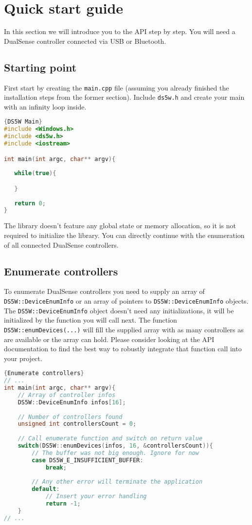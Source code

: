 \section{Quick start guide}
In this section we will introduce you to the API step by step. You will need a DualSense controller connected via USB or Bluetooth.

\subsection{Starting point}
First start by creating the \texttt{main.cpp} file (assuming you already finished the installation steps from the former section). Include \texttt{ds5w.h} and create your main with an infinity loop inside.
\begin{lstlisting}[language=C++,label=code0,caption={DS5W Main}]{DS5W Main}
#include <Windows.h>
#include <ds5w.h>
#include <iostream>

int main(int argc, char** argv){
   
   while(true){

   }
   
   return 0;
}
\end{lstlisting}
The library doesn't feature any global state or memory allocation, so it is not required to initialize the library. You can directly continue with the enumeration of all connected DualSense controllers.

\subsection{Enumerate controllers}
To enumerate DualSense controllers you need to supply an array of \texttt{DS5W::DeviceEnumInfo} or an array of pointers to \texttt{DS5W::DeviceEnumInfo} objects. The \texttt{DS5W::DeviceEnumInfo} object doesn't need any initializations, it will be initialized by the function you will call next. The function \texttt{DS5W::enumDevices(...)} will fill the supplied array with as many controllers as are available or the array can hold. Please consider looking at the API documentation to find the best way to robustly integrate that function call into your project.\\

\begin{minipage}{\textwidth}
\begin{lstlisting}[language=C++,label=code1,caption={Enumerate controllers}]{Enumerate controllers}
// ...
int main(int argc, char** argv){
	// Array of controller infos
	DS5W::DeviceEnumInfo infos[16];
	
	// Number of controllers found
	unsigned int controllersCount = 0;
	
	// Call enumerate function and switch on return value
	switch(DS5W::enumDevices(infos, 16, &controllersCount)){
		// The buffer was not big enough. Ignore for now
		case DS5W_E_INSUFFICIENT_BUFFER:
			break;
			
		// Any other error will terminate the application
		default:
			// Insert your error handling
			return -1;
	}
// ...
\end{lstlisting}
\end{minipage}


